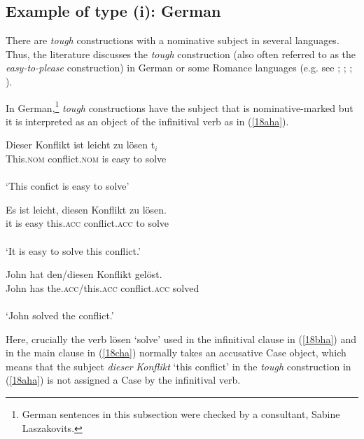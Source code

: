 \documentclass[output=paper,colorlinks,citecolor=brown,
]{langscibook}
\begin{document}
\subsection{Example of type (i): German} \label{s3.2ha}
There are \textit{tough} constructions with a nominative subject in several languages. Thus, the literature discusses the \textit{tough} construction (also often referred to as the \textit{easy-to-please} construction) in German or some Romance languages (e.g. see \citeauthor{MontalbettiMarioTravis1982} \citeyear{MontalbettiMarioTravis1982}; \citeauthor{Cinque1990} \citeyear{Cinque1990}; \citeauthor{Roberts1993} \citeyear{Roberts1993}; \citeauthor{Wurmbrand2001} \citeyear{Wurmbrand2001}).

In German,\footnote{German sentences in this subsection were checked by a consultant, Sabine Laszakovits.} \textit{tough} constructions have the subject that is nominative-marked but it is interpreted as an object of the infinitival verb as in (\ref{18aha}).

\begin{exe}
\ex \label{18ha}
\begin{xlist}
\ex \label{18aha}
\gll Dieser Konflikt ist  leicht zu lösen t$_{i}$\\
This.\textsc{nom} conflict.\textsc{nom} is easy to solve\\\\
‘This confict is easy to solve’                             

\ex \label{18bha}
\gll Es ist leicht, diesen Konflikt zu lösen.\\
it is easy this.\textsc{acc} conflict.\textsc{acc} to solve\\\\
‘It is easy to solve this conflict.'

\ex \label{18cha}
\gll John hat den/diesen  Konflikt gelöst.\\
John has the.\textsc{acc}/this.\textsc{acc} conflict.\textsc{acc} solved\\\\
‘John solved the conflict.’

\end{xlist}
\end{exe}

Here, crucially the verb lösen ‘solve’ used in the infinitival clause in (\ref{18bha}) and in the main clause in (\ref{18cha}) normally takes an accusative Case object, which means that the subject \textit{dieser} \textit{Konflikt} ‘this conflict’ in the \textit{tough} construction in (\ref{18aha}) is not assigned a Case by the infinitival verb.
\end{document}
